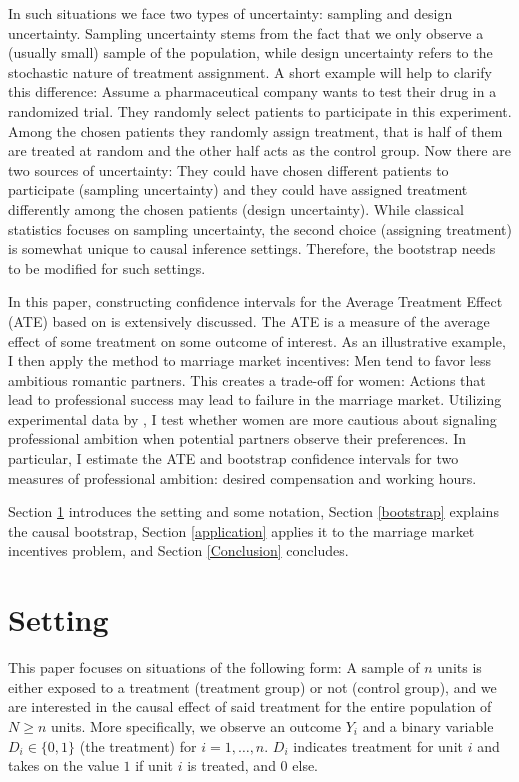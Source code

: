 \documentclass[aodsor,preprint]{imsart}
\numberwithin{equation}{section}
\theoremstyle{plain}
\begin{document}
In such situations we face two types of uncertainty: sampling and design uncertainty. Sampling uncertainty stems from the fact that we only observe a (usually small) sample of the population, while design uncertainty refers to the stochastic nature of treatment assignment. A short example will help to clarify this difference: Assume a pharmaceutical company wants to test their drug in a randomized trial. They randomly select patients to participate in this experiment. Among the chosen patients they randomly assign treatment, that is half of them are treated at random and the other half acts as the control group. Now there are two sources of uncertainty: They could have chosen different patients to participate (sampling uncertainty) and they could have assigned treatment differently among the chosen patients (design uncertainty). While classical statistics focuses on sampling uncertainty, the second choice (assigning treatment) is somewhat unique to causal inference settings. Therefore, the bootstrap needs to be modified for such settings.

In this paper, constructing confidence intervals for the Average Treatment Effect (ATE) based on \cite{Imbens_2021} is extensively discussed. The ATE is a measure of the average effect of some treatment on some outcome of interest. As an illustrative example, I then apply the method to marriage market incentives: Men tend to favor less ambitious romantic partners. This creates a trade-off for women: Actions that lead to professional success may lead to failure in the marriage market. Utilizing experimental data by \cite{Bursztyn_2017}, I test whether women are more cautious about signaling professional ambition when potential partners observe their preferences. In particular, I estimate the ATE and bootstrap confidence intervals for two measures of professional ambition: desired compensation and working hours.

Section \ref{setting} introduces the setting and some notation, Section \ref{bootstrap} explains the causal bootstrap, Section \ref{application} applies it to the marriage market incentives problem, and Section \ref{Conclusion} concludes.



\section{Setting} \label{setting}

This paper focuses on situations of the following form: A sample of $n$ units is either exposed to a treatment (treatment group) or not (control group), and we are interested in the causal effect of said treatment for the entire population of $N \geq n$ units. More specifically, we observe an outcome $Y_i$ and a binary variable $D_i \in \{0, 1\}$ (the treatment) for $i = 1,\ldots, n$. $D_i$ indicates treatment for unit $i$ and takes on the value $1$ if unit $i$ is treated, and $0$ else.
\end{document}
